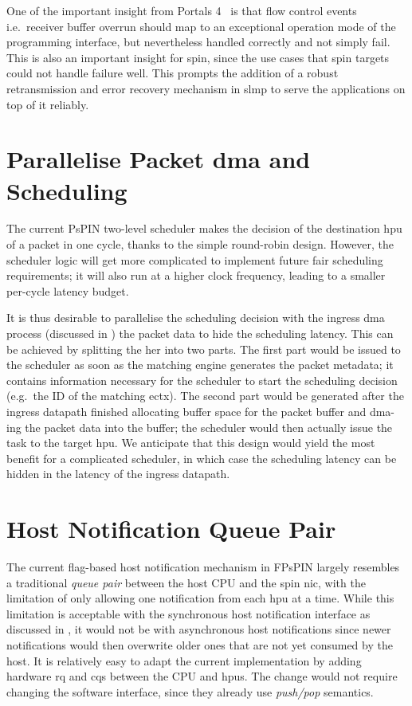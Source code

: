 One of the important insight from Portals 4~\cite{barrett_portals_nodate} is that flow control events i.e.\ receiver buffer overrun should map to an exceptional operation mode of the programming interface, but nevertheless handled correctly and not simply fail.  This is also an important insight for \ac{spin}, since the use cases that \ac{spin} targets could not handle failure well.  This prompts the addition of a robust retransmission and error recovery mechanism in \ac{slmp} to serve the applications on top of it reliably.

\section{Parallelise Packet \acs{dma} and Scheduling} \label{sec:ingress-latency-hiding}

The current PsPIN two-level scheduler makes the decision of the destination \ac{hpu} of a packet in one cycle, thanks to the simple round-robin design.  However, the scheduler logic will get more complicated to implement future fair scheduling requirements; it will also run at a higher clock frequency, leading to a smaller per-cycle latency budget.

It is thus desirable to parallelise the scheduling decision with the ingress \ac{dma} process (discussed in ) the packet data to hide the scheduling latency.  This can be achieved by splitting the \ac{her} into two parts.  The first part would be issued to the scheduler as soon as the matching engine generates the packet metadata; it contains information necessary for the scheduler to start the scheduling decision (e.g.\ the ID of the matching \ac{ectx}).  The second part would be generated after the ingress datapath finished allocating buffer space for the packet buffer and \ac{dma}-ing the packet data into the buffer; the scheduler would then actually issue the task to the target \ac{hpu}.  We anticipate that this design would yield the most benefit for a complicated scheduler, in which case the scheduling latency can be hidden in the latency of the ingress datapath.

\section{Host Notification Queue Pair} \label{sec:host-dma-qp}

The current flag-based host notification mechanism in FPsPIN largely resembles a traditional \emph{queue pair} between the host CPU and the \ac{spin} \ac{nic}, with the limitation of only allowing one notification from each \ac{hpu} at a time.  While this limitation is acceptable with the synchronous host notification interface as discussed in , it would not be with asynchronous host notifications since newer notifications would then overwrite older ones that are not yet consumed by the host.  It is relatively easy to adapt the current implementation by adding hardware \ac{rq} and \ac{cq}s between the CPU and \ac{hpu}s.  The change would not require changing the software interface, since they already use \emph{push/pop} semantics.

